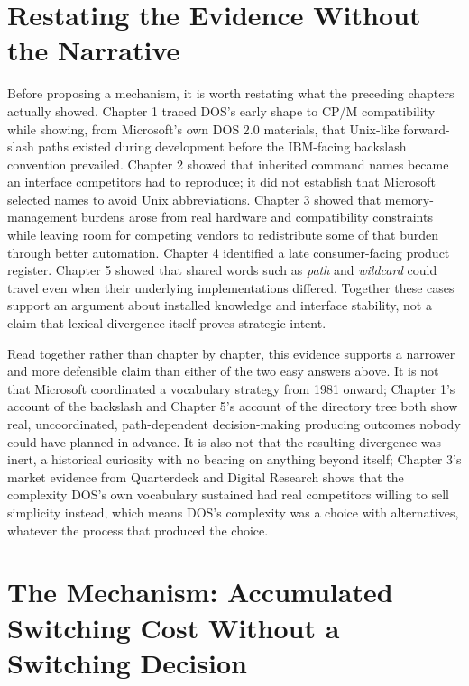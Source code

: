 \documentclass[11pt]{book}
\begin{document}
\section{Restating the Evidence Without the Narrative}

Before proposing a mechanism, it is worth restating what the preceding chapters actually showed. Chapter 1 traced DOS's early shape to CP/M compatibility while showing, from Microsoft's own DOS 2.0 materials, that Unix-like forward-slash paths existed during development before the IBM-facing backslash convention prevailed. Chapter 2 showed that inherited command names became an interface competitors had to reproduce; it did not establish that Microsoft selected names to avoid Unix abbreviations. Chapter 3 showed that memory-management burdens arose from real hardware and compatibility constraints while leaving room for competing vendors to redistribute some of that burden through better automation. Chapter 4 identified a late consumer-facing product register. Chapter 5 showed that shared words such as \emph{path} and \emph{wildcard} could travel even when their underlying implementations differed. Together these cases support an argument about installed knowledge and interface stability, not a claim that lexical divergence itself proves strategic intent.

Read together rather than chapter by chapter, this evidence supports a narrower and more defensible claim than either of the two easy answers above. It is not that Microsoft coordinated a vocabulary strategy from 1981 onward; Chapter 1's account of the backslash and Chapter 5's account of the directory tree both show real, uncoordinated, path-dependent decision-making producing outcomes nobody could have planned in advance. It is also not that the resulting divergence was inert, a historical curiosity with no bearing on anything beyond itself; Chapter 3's market evidence from Quarterdeck and Digital Research shows that the complexity DOS's own vocabulary sustained had real competitors willing to sell simplicity instead, which means DOS's complexity was a choice with alternatives, whatever the process that produced the choice.

\section{The Mechanism: Accumulated Switching Cost Without a Switching Decision}
\end{document}
